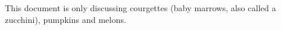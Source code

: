 \documentclass[12pt]{article}
\begin{document}
 This document is only discussing \glspl {courgette} (baby \glspl {marrow}, also called a \gls {zucchini}), \glspl {pumpkin} and \glspl {melon}.
\printglossaries 
\end{document}
